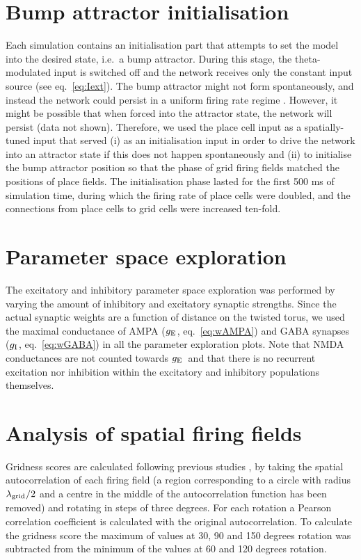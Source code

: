 \documentclass[a4paper,12pt]{article}
\newcommand{\ssc}[3]{\ensuremath{#1_{\text{#2}_{\text{#3}}}}}
\newcommand{\gE      }{\ssc{g}      {\scriptsize{E}}{}}
\newcommand{\gI      }{\ssc{g}      {\scriptsize{I}}{}}
\newcommand{\lamgrid}{\ssc{\lambda}{\scriptsize{grid}}{}}
\begin{document}
\section{Bump attractor initialisation} \label{sec:noise_bump_init_app}

Each simulation contains an initialisation part that attempts to set the model
into the desired state, i.e.\ a bump attractor. During this stage, the
theta-modulated input is switched off and the network receives only the
constant input source (see eq.~\ref{eq:Iext}). The bump attractor might not
form spontaneously, and instead the network could persist in a  uniform firing
rate regime \citep{Compte:2000ul}. However, it might be possible that when
forced into the attractor state, the network will persist (data not shown).
Therefore, we used the place cell input as a spatially-tuned input that served
(i) as an initialisation input in order to drive the network into an attractor
state if this does not happen spontaneously and (ii) to initialise the bump
attractor position so that the phase of grid firing fields matched the positions
of place fields. The initialisation phase lasted for the first 500 ms of
simulation time, during which the firing rate of place cells were doubled, and
the connections from place cells to grid cells were increased ten-fold.



\section{Parameter space exploration} \label{sec:param_sweeps}

The excitatory and inhibitory parameter space exploration was performed by
varying the amount of inhibitory and excitatory synaptic strengths. Since the
actual synaptic weights are a function of distance on the twisted torus, we
used the maximal conductance of AMPA ($\gE$, eq.~\ref{eq:wAMPA}) and GABA
synapses ($\gI$, eq.~\ref{eq:wGABA}) in all the parameter exploration plots.
Note that NMDA conductances are not counted towards $\gE$\ and that there is no
recurrent excitation nor inhibition within the excitatory and inhibitory
populations themselves.



\section{Analysis of spatial firing fields}

Gridness scores are calculated following previous studies
\citep{Sargolini:2006ba}, by taking the spatial autocorrelation of each firing
field (a region corresponding to a circle with radius $\lamgrid/2$ and a centre
in the middle of the autocorrelation function has been removed) and rotating in
steps of three degrees. For each rotation a Pearson correlation coefficient is
calculated with the original autocorrelation. To calculate the gridness score
the maximum of values at 30, 90 and 150 degrees rotation was subtracted from
the minimum of the values at 60 and 120 degrees rotation.
\end{document}
